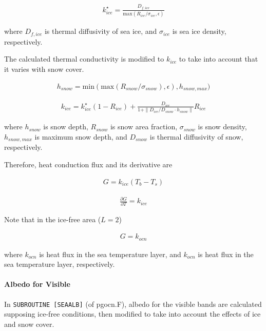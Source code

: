 \begin{eqnarray}
k_{ice}^\star = \frac{D_{f,ice}}{\mathrm{max}(R_{ice}/\sigma_{ice}, \epsilon)}
\end{eqnarray}

where \(D_{f,ice}\) is thermal diffusivity of sea ice, and
\(\sigma_{ice}\) is sea ice density, respectively.

The calculated thermal conductivity is modified to \(k_{ice}\) to take
into account that it varies with snow cover.

\begin{eqnarray}
h_{snow} = \mathrm{min}(
    \mathrm{max}(
    R_{snow}/\sigma_{snow}),\epsilon
        ),h_{snow,max}
        )
\end{eqnarray}

\begin{eqnarray}      
k_{ice} = k_{ice}^\star (1-R_{ice}) + \frac{D_{ice}}{1+\| D_{ice}/D_{snow} \cdot h_{snow} \|} R_{ice}
\end{eqnarray}

where \(h_{snow}\) is snow depth, \(R_{snow}\) is snow area fraction,
\(\sigma_{snow}\) is snow density, \(h_{snow,max}\) is maximum snow
depth, and \(D_{snow}\) is thermal diffusivity of snow, respectively.

Therefore, heat conduction flux and its derivative are

\begin{eqnarray}
 G = k_{ice} (T_b - T_s)
\end{eqnarray}

\begin{eqnarray}
 \frac{\partial G}{\partial T} = k_{ice}
\end{eqnarray}

Note that in the ice-free area (\(L=2\))

\begin{eqnarray}
G=k_{ocn}
\end{eqnarray}

where \(k_{ocn}\) is heat flux in the sea temperature layer, and
\(k_{ocn}\) is heat flux in the sea temperature layer, respectively.

\hypertarget{albedo-for-visible}{%
\paragraph{Albedo for Visible}\label{albedo-for-visible}}

In \texttt{SUBROUTINE\ {[}SEAALB{]}} (of pgocn.F), albedo for the
visible bands are calculated supposing ice-free conditions, then
modified to take into account the effects of ice and snow cover.

